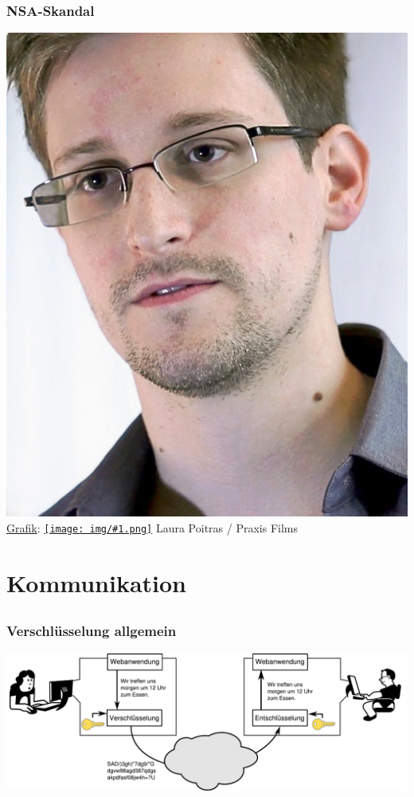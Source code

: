 \documentclass[12pt]{beamer}
\newcommand{\cc}[1]{\texttt{[image: img/\#1.png]}\hspace{1mm}}
\begin{document}
\begin{frame}
    \frametitle{NSA-Skandal}
    \includegraphics[height=0.7\textheight]{img/snowden.jpg}
    \\{\small \href{https://commons.wikimedia.org/wiki/File:Edward_Snowden.jpg\#mediaviewer/File:Edward_Snowden-2.jpg}{Grafik}: \href{https://creativecommons.org/licenses/by/3.0/}{\cc{by}} Laura Poitras / Praxis Films}
\end{frame}

\section{Kommunikation}
\subsection{}
\begin{frame}
    \frametitle{Verschlüsselung allgemein}
    \includegraphics[width=\textwidth]{img/krypto.pdf}
\end{frame}
\end{document}
